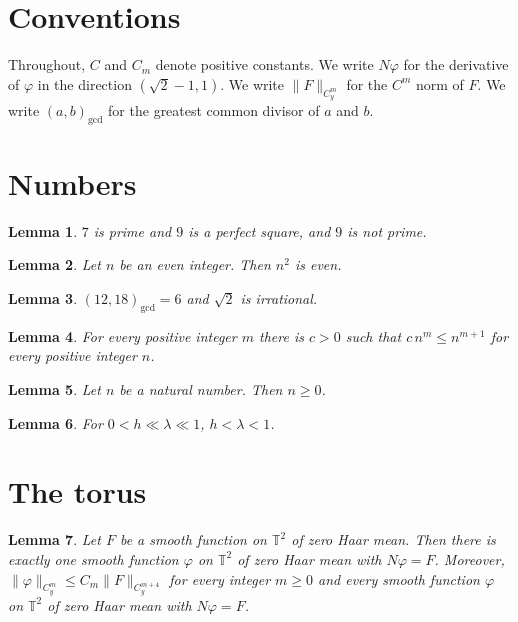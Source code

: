 \documentclass{article}
\newtheorem{lemma}{Lemma}
\begin{document}
\section{Conventions}

Throughout, $C$ and $C_m$ denote positive constants.
We write $N\varphi$ for the derivative of $\varphi$ in the direction $(\sqrt2-1,1)$.
We write $\|F\|_{C_y^m}$ for the $C^m$ norm of $F$.
We write $(a,b)_{\gcd}$ for the greatest common divisor of $a$ and $b$.

\section{Numbers}

\begin{lemma}\label{primes}
$7$ is prime and $9$ is a perfect square, and $9$ is not prime.
\end{lemma}

\begin{lemma}\label{even}
Let $n$ be an even integer. Then $n^2$ is even.
\end{lemma}

\begin{lemma}\label{gcd}
$(12,18)_{\gcd}=6$ and $\sqrt2$ is irrational.
\end{lemma}

\begin{lemma}\label{constants}
For every positive integer $m$ there is $c>0$ such that $c\,n^m\le n^{m+1}$ for every positive integer $n$.
\end{lemma}

\begin{lemma}\label{natural}
Let $n$ be a natural number. Then $n\ge0$.
\end{lemma}

\begin{lemma}\label{small}
For $0<h\ll\lambda\ll1$, $h<\lambda<1$.
\end{lemma}

\section{The torus}

\begin{lemma}\label{inverse}
Let $F$ be a smooth function on $\mathbb T^2$ of zero Haar mean. Then there is exactly one smooth function $\varphi$ on $\mathbb T^2$ of zero Haar mean with $N\varphi=F$. Moreover, $\|\varphi\|_{C_y^m}\le C_m\|F\|_{C_y^{m+4}}$ for every integer $m\ge0$ and every smooth function $\varphi$ on $\mathbb T^2$ of zero Haar mean with $N\varphi=F$.
\end{lemma}
\end{document}
